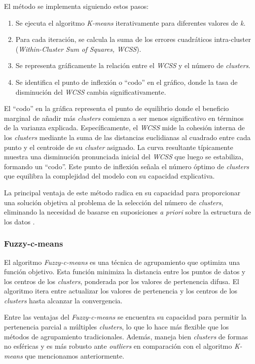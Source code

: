 \documentclass[11pt,a4paper,twoside,openany]{tesis}
\begin{document}
El método se implementa siguiendo estos pasos:
\begin{enumerate}
\item Se ejecuta el algoritmo \emph{K-means} iterativamente para diferentes valores de \emph{k}.
\item Para cada iteración, se calcula la suma de los errores cuadráticos intra-cluster (\emph{Within-Cluster Sum of Squares, WCSS}).
\item Se representa gráficamente la relación entre el \emph{WCSS} y el número de \emph{clusters}.
\item Se identifica el punto de inflexión o ``codo'' en el gráfico, donde la tasa de disminución del \emph{WCSS} cambia significativamente.
\end{enumerate}

El ``codo'' en la gráfica representa el punto de equilibrio donde el beneficio marginal de añadir más \emph{clusters} comienza a ser menos significativo en términos de la varianza explicada. Específicamente, el \emph{WCSS} mide la cohesión interna de los \emph{clusters} mediante la suma de las distancias euclidianas al cuadrado entre cada punto y el centroide de su \emph{cluster} asignado. La curva resultante típicamente muestra una disminución pronunciada inicial del \emph{WCSS} que luego se estabiliza, formando un ``codo''. Este punto de inflexión señala el número óptimo de \emph{clusters} que equilibra la complejidad del modelo con su capacidad explicativa.

La principal ventaja de este método radica en su capacidad para proporcionar una solución objetiva al problema de la selección del número de \emph{clusters}, eliminando la necesidad de basarse en suposiciones \emph{a priori} sobre la estructura de los datos \cite{metodo-codo}.


\subsubsection{Fuzzy-c-means} \textbf{ }

El algoritmo \emph{Fuzzy-c-means} es una técnica de agrupamiento que optimiza una función objetivo. Esta función minimiza la distancia entre los puntos de datos y los centros de los \emph{clusters}, ponderada por los valores de pertenencia difusa. El algoritmo itera entre actualizar los valores de pertenencia y los centros de los \emph{clusters} hasta alcanzar la convergencia. 

Entre las ventajas del \emph{Fuzzy-c-means} se encuentra su capacidad para permitir la pertenencia parcial a múltiples \emph{clusters}, lo que lo hace más flexible que los métodos de agrupamiento tradicionales. Además, maneja bien \emph{clusters} de formas no esféricas y es más robusto ante \emph{outliers} en comparación con el algoritmo \emph{K-means} que mencionamos anteriormente.
\end{document}
